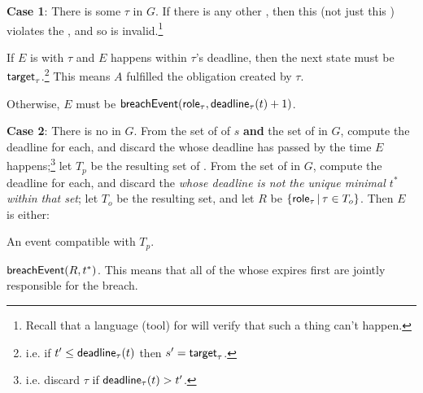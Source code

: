 \documentclass[12pt]{article}
\begin{document}
{\bf Case 1}: There is some \enabled \mustntran $\tau$ in $G$. If there is any other \enabled \transition, then this \Contract (not just this \trace) violates the \uaoc, and so is invalid.\footnote{Recall that a language (tool) for \FSContracts will verify that such a thing can't happen.} 
\begin{PPI}
    \item If $E$ is \compatible with $\tau$ and $E$ happens within $\tau$'s deadline, then the next state must be $\textsf{target}_{\tau}$.\footnote{i.e. if $t' \leq \textsf{deadline}_{\tau}(t)$ then $s' = \textsf{target}_{\tau}$.} This means $A$ fulfilled the obligation created by $\tau$.
    \item Otherwise, $E$ must be $\textsf{breachEvent}(\textsf{role}_{\tau},\textsf{deadline}_{\tau}(t) + 1)$. %
\end{PPI}

{\bf Case 2}: There is no \enabled \mustntran in $G$. From the set of \enabled \mayntrans of $s$ {\bf and} the set of \enabled \rmustntrans in $G$, compute the deadline for each, and discard the \transitions whose deadline has passed by the time $E$ happens;\footnote{i.e. discard $\tau$ if $\textsf{deadline}_{\tau}(t) > t'$.}  let $T_p$ be the resulting set of \transitions. From the set of \enabled \rmustntrans in $G$, compute the deadline for each, and discard the {\transitions} {\it whose deadline is not the unique minimal \TimeStamp $t^*$ within that set}; let $T_o$ be the resulting set, and let $R$ be $\{ \textsf{role}_{\tau} \, \vert \, \tau \in T_{o} \}$. Then $E$ is either:
\begin{PPI}
	\item An event compatible with $T_p$.
	\item $\textsf{breachEvent}(R,t^*)$. This means that all of the \Roles whose \rmustntran expires first are jointly responsible for the breach.
\end{PPI}	

\end{document}
